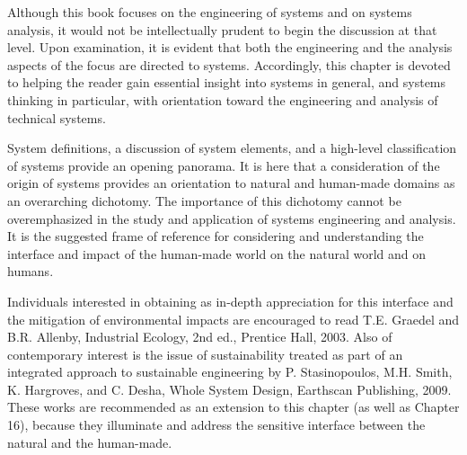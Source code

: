 Although this book focuses on the engineering of systems and on systems analysis, it would not be intellectually prudent to begin the discussion at that level. Upon examination, it is evident that both the engineering and the analysis aspects of the focus are directed to systems. Accordingly, this chapter is devoted to helping the reader gain essential insight into systems in general, and systems thinking in particular, with orientation toward the engineering and analysis of technical systems.

System definitions, a discussion of system elements, and a high-level classification of systems provide an opening panorama. It is here that a consideration of the origin of systems provides an orientation to natural and human-made domains as an overarching dichotomy. The importance of this dichotomy cannot be overemphasized in the study and application of systems engineering and analysis. It is the suggested frame of reference for considering and understanding the interface and impact of the human-made world on the natural world and on humans.

Individuals interested in obtaining as in-depth appreciation for this interface and the mitigation of environmental impacts are encouraged to read T.E. Graedel and B.R. Allenby, Industrial Ecology, 2nd ed., Prentice Hall, 2003. Also of contemporary interest is the issue of sustainability treated as part of an integrated approach to sustainable engineering by P. Stasinopoulos, M.H. Smith, K. Hargroves, and C. Desha, Whole System Design, Earthscan Publishing, 2009. These works are recommended as an extension to this chapter (as well as Chapter 16), because they illuminate and address the sensitive interface between the natural and the human-made.


\begin{exercises}
    \begin{exercise}
    \label{sea-5-1}
    
    \end{exercise}
    \begin{solution}
    \end{solution}

\end{exercises}
